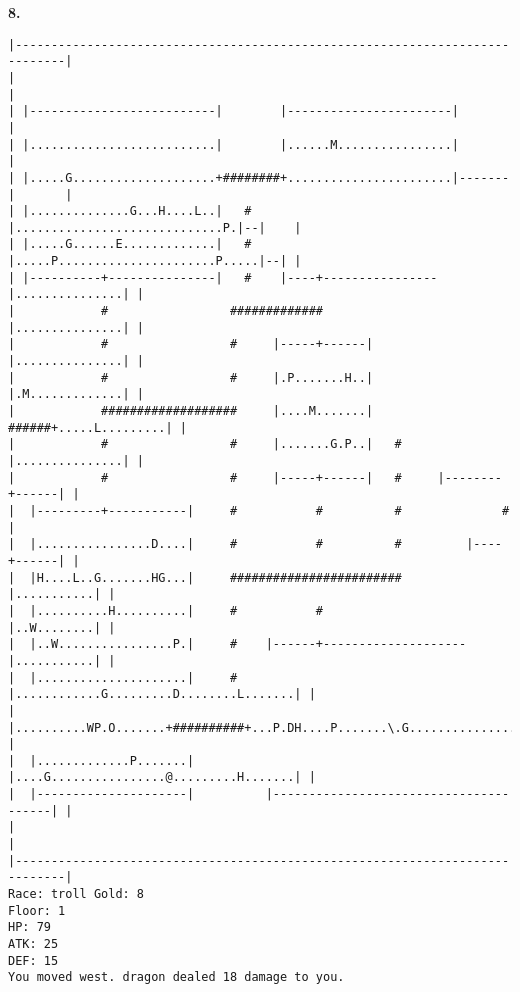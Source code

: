 \documentclass[11pt]{article}
\theoremstyle{plain}
\begin{document}
\newpage
\textbf{8. }
\begin{Verbatim}[fontsize=\scriptsize]
|-----------------------------------------------------------------------------|
|                                                                             |
| |--------------------------|        |-----------------------|               |
| |..........................|        |......M................|               |
| |.....G....................+########+.......................|-------|       |
| |..............G...H....L..|   #    |.............................P.|--|    |
| |.....G......E.............|   #    |.....P......................P.....|--| |
| |----------+---------------|   #    |----+----------------|...............| |
|            #                 #############                |...............| |
|            #                 #     |-----+------|         |...............| |
|            #                 #     |.P.......H..|         |.M.............| |
|            ###################     |....M.......|   ######+.....L.........| |
|            #                 #     |.......G.P..|   #     |...............| |
|            #                 #     |-----+------|   #     |--------+------| |
|  |---------+-----------|     #           #          #              #        |
|  |................D....|     #           #          #         |----+------| |
|  |H....L..G.......HG...|     ########################         |...........| |
|  |..........H..........|     #           #                    |..W........| |
|  |..W................P.|     #    |------+--------------------|...........| |
|  |.....................|     #    |............G.........D........L.......| |
|  |..........WP.O.......+##########+...P.DH....P.......\.G.................| |
|  |.............P.......|          |....G................@.........H.......| |
|  |---------------------|          |---------------------------------------| |
|                                                                             |
|-----------------------------------------------------------------------------|
Race: troll Gold: 8                                                    Floor: 1
HP: 79
ATK: 25
DEF: 15
You moved west. dragon dealed 18 damage to you. 
\end{Verbatim}
\end{document}
